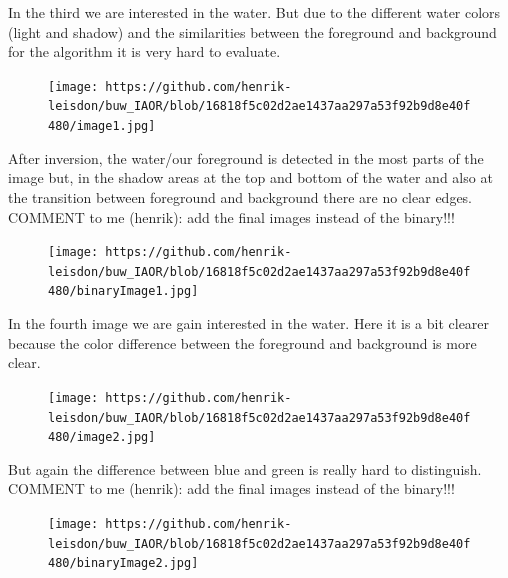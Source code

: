 \documentclass[11pt,a4paper]{scartcle}
\begin{document}
In the third we are interested in the water. But due to the different water colors (light and shadow) and the similarities between the foreground and background for the algorithm it is very hard to evaluate. 
\begin{figure}
	\centering
\texttt{[image: https://github.com/henrik-leisdon/buw\_IAOR/blob/16818f5c02d2ae1437aa297a53f92b9d8e40f480/image1.jpg]}
\end{figure}
After inversion, the water/our foreground is detected in the most parts
of the image but, in the shadow areas at the top and bottom of the water
and also at the transition between foreground and background there are
no clear edges. COMMENT to me (henrik): add the final images instead of
the binary!!!
\begin{figure}
	\centering
\texttt{[image: https://github.com/henrik-leisdon/buw\_IAOR/blob/16818f5c02d2ae1437aa297a53f92b9d8e40f480/binaryImage1.jpg]}
\end{figure}
In the fourth image we are gain interested in the water. Here it is a
bit clearer because the color difference between the foreground and
background is more clear.
\begin{figure}
	\centering
\texttt{[image: https://github.com/henrik-leisdon/buw\_IAOR/blob/16818f5c02d2ae1437aa297a53f92b9d8e40f480/image2.jpg]}
\end{figure}
But again the difference between blue and green is really hard to distinguish. COMMENT to me (henrik): add the final images instead of the binary!!!
\begin{figure}
	\centering
\texttt{[image: https://github.com/henrik-leisdon/buw\_IAOR/blob/16818f5c02d2ae1437aa297a53f92b9d8e40f480/binaryImage2.jpg]}
\end{figure}
\end{document}
